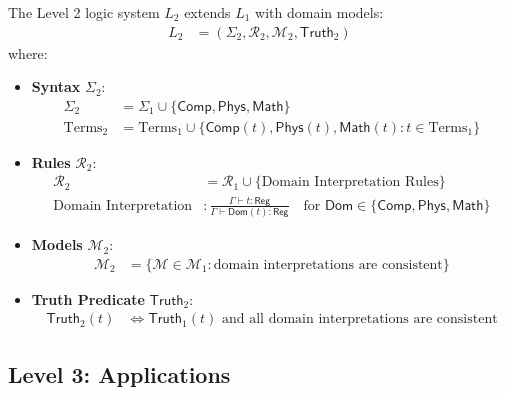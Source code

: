 \begin{definition}
The Level 2 logic system $L_2$ extends $L_1$ with domain models:
\begin{align}
L_2 &= (\Sigma_2, \mathcal{R}_2, \mathcal{M}_2, \mathsf{Truth}_2)
\end{align}
where:
\begin{itemize}
\item \textbf{Syntax} $\Sigma_2$:
  \begin{align}
  \Sigma_2 &= \Sigma_1 \cup \{\mathsf{Comp}, \mathsf{Phys}, \mathsf{Math}\}\\
  \text{Terms}_2 &= \text{Terms}_1 \cup \{\mathsf{Comp}(t), \mathsf{Phys}(t), \mathsf{Math}(t) : t \in \text{Terms}_1\}
  \end{align}
\item \textbf{Rules} $\mathcal{R}_2$:
  \begin{align}
  \mathcal{R}_2 &= \mathcal{R}_1 \cup \{\text{Domain Interpretation Rules}\}\\
  \text{Domain Interpretation} &: \frac{\Gamma \vdash t : \mathsf{Reg}}{\Gamma \vdash \mathsf{Dom}(t) : \mathsf{Reg}} \quad \text{for } \mathsf{Dom} \in \{\mathsf{Comp}, \mathsf{Phys}, \mathsf{Math}\}
  \end{align}
\item \textbf{Models} $\mathcal{M}_2$:
  \begin{align}
  \mathcal{M}_2 &= \{\mathcal{M} \in \mathcal{M}_1 : \text{domain interpretations are consistent}\}
  \end{align}
\item \textbf{Truth Predicate} $\mathsf{Truth}_2$:
  \begin{align}
  \mathsf{Truth}_2(t) &\Leftrightarrow \mathsf{Truth}_1(t) \text{ and all domain interpretations are consistent}
  \end{align}
\end{itemize}
\end{definition}

\subsection{Level 3: Applications}

